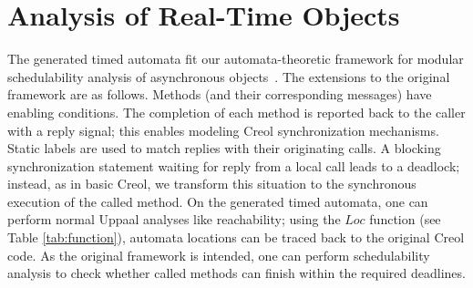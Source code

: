 \documentclass[copyright,creativecommons]{eptcs}
\theoremstyle{definition}
\newcommand{\id}[1]{\mathit{#1}}
\newcommand{\Uppaal}{{\sc Uppaal}\xspace}
\begin{document}


































\section{Analysis of Real-Time Objects}\label{sec::analysis}


The generated timed automata fit our automata-theoretic framework for modular schedulability analysis of asynchronous objects~\cite{Jaghoori09jlap,JaghouriDBC08RTSS}. The extensions to the original framework  are as follows.
Methods (and their corresponding messages) have enabling conditions.
The completion of each method is reported back to the caller with a reply signal; this enables modeling Creol synchronization mechanisms.
Static labels are used to match replies with their originating calls.
A blocking synchronization statement waiting for reply from a local call leads to a deadlock; instead, as in basic Creol, we transform this situation to the  synchronous execution of the called method.
On the generated timed automata, one can perform normal \Uppaal analyses like reachability; using the $\id{Loc}$ function (see Table \ref{tab:function}), automata locations can be traced back to the original Creol code.
As the original framework is intended, one can perform schedulability analysis to check whether called methods can finish within the required deadlines.
\end{document}
